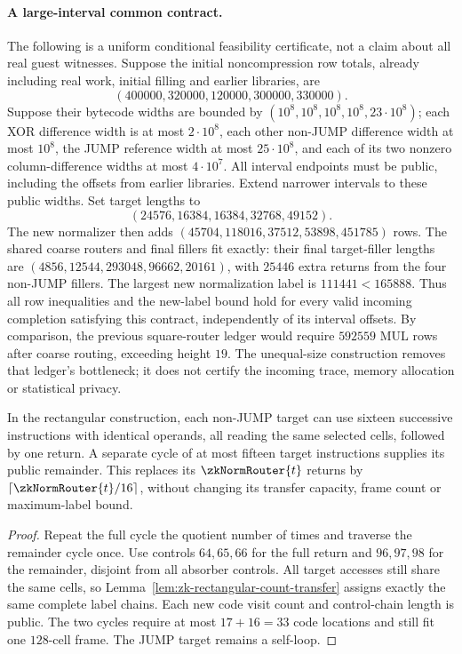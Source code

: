 \paragraph{A large-interval common contract.} The following is a uniform conditional feasibility certificate, not a claim about all real guest witnesses. Suppose the initial noncompression row totals, already including real work, initial filling and earlier libraries, are
\[
 (400000,320000,120000,300000,330000).
\]
Suppose their bytecode widths are bounded by $(10^8,10^8,10^8,10^8,23\cdot10^8)$; each XOR difference width is at most $2\cdot10^8$, each other non-JUMP difference width at most $10^8$, the JUMP reference width at most $25\cdot10^8$, and each of its two nonzero column-difference widths at most $4\cdot10^7$. All interval endpoints must be public, including the offsets from earlier libraries. Extend narrower intervals to these public widths. Set target lengths to
\[
 (24576,16384,16384,32768,49152).
\]
The new normalizer then adds $(45704,118016,37512,53898,451785)$ rows. The shared coarse routers and final fillers fit exactly: their final target-filler lengths are $(4856,12544,293048,96662,20161)$, with $25446$ extra returns from the four non-JUMP fillers. The largest new normalization label is $111441<165888$. Thus all row inequalities and the new-label bound hold for every valid incoming completion satisfying this contract, independently of its interval offsets. By comparison, the previous square-router ledger would require $592559$ MUL rows after coarse routing, exceeding height $19$. The unequal-size construction removes that ledger's bottleneck; it does not certify the incoming trace, memory allocation or statistical privacy.

\begin{lemma}\label{lem:zk-batched-count-targets}
In the rectangular construction, each non-JUMP target can use sixteen successive instructions with identical operands, all reading the same selected cells, followed by one return. A separate cycle of at most fifteen target instructions supplies its public remainder. This replaces its $\zkNormRouter{t}$ returns by $\lceil\zkNormRouter{t}/16\rceil$, without changing its transfer capacity, frame count or maximum-label bound.
\end{lemma}
\begin{proof}
Repeat the full cycle the quotient number of times and traverse the remainder cycle once. Use controls $64,65,66$ for the full return and $96,97,98$ for the remainder, disjoint from all absorber controls. All target accesses still share the same cells, so Lemma~\ref{lem:zk-rectangular-count-transfer} assigns exactly the same complete label chains. Each new code visit count and control-chain length is public. The two cycles require at most $17+16=33$ code locations and still fit one $128$-cell frame. The JUMP target remains a self-loop.
\end{proof}

